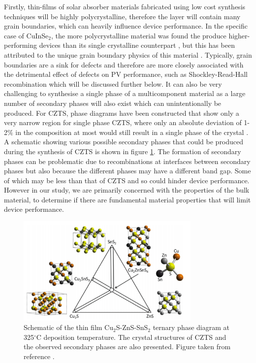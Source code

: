 Firstly, thin-films of solar absorber materials fabricated using low cost synthesis techniques will be highly polycrystalline, therefore the layer will contain many grain boundaries, which can heavily influence device performance. In the specific case of CuInSe$_2$, the more polycrystalline material was found the produce higher-performing devices than its single crystalline counterpart \cite{CIS1_3, CIS1_4}, but this has been attributed to the unique grain boundary physics of this material \cite{CIS1, CIS2}. Typically, grain boundaries are a sink for defects and therefore are more closely associated with the detrimental effect of defects on PV performance, such as Shockley-Read-Hall recombination which will be discussed further below. 
It can also be very challenging to synthesise a single phase of a multicomponent material as a large number of secondary phases will also exist which can unintentionally be produced. For CZTS, phase diagrams have been constructed that show only a very narrow region for single phase CZTS, where only an absolute deviation of 1-2$\%$ in the composition at most would still result in a single phase of the crystal \cite{SandS}. A schematic showing various possible secondary phases that could be produced during the synthesis of CZTS is shown in figure \ref{CZTS_phase_diagram}. The formation of secondary phases can be problematic due to recombinations at interfaces between secondary phases but also because the different phases may have a different band gap. Some of which may be less than that of CZTS and so could hinder device performance.
However in our study, we are primarily concerned with the properties of the bulk material, to determine if there are fundamental material properties that will limit device performance.\\

\begin{figure}[h!]
  \centering
    \includegraphics[width=0.8\textwidth]{figures/CZTS_phase_diagram.png}
    \caption{Schematic of the thin film
Cu$_2$S-ZnS-SnS$_2$ ternary phase diagram at 325$^{\circ}$C deposition temperature. The crystal structures of CZTS and the observed secondary phases are also presented. Figure taken from reference .}
  \label{CZTS_phase_diagram}
\end{figure}

